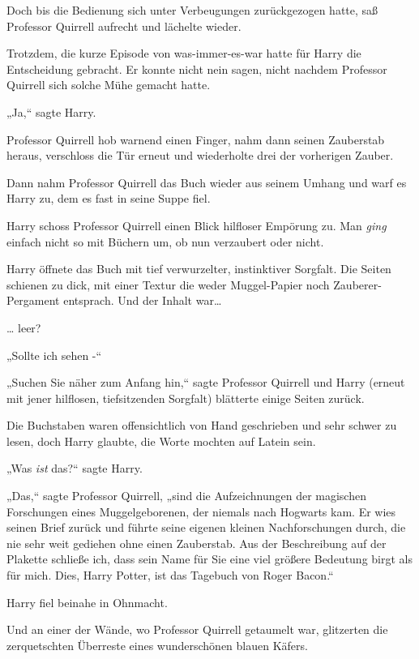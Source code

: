 {Doch bis die Bedienung sich unter Verbeugungen zurückgezogen hatte, saß Professor Quirrell aufrecht und lächelte wieder.

Trotzdem, die kurze Episode von was-immer-es-war hatte für Harry die Entscheidung gebracht. Er konnte nicht nein sagen, nicht nachdem Professor Quirrell sich solche Mühe gemacht hatte.

„Ja,“ sagte Harry.

Professor Quirrell hob warnend einen Finger, nahm dann seinen Zauberstab heraus, verschloss die Tür erneut und wiederholte drei der vorherigen Zauber.

Dann nahm Professor Quirrell das Buch wieder aus seinem Umhang und warf es Harry zu, dem es fast in seine Suppe fiel.

Harry schoss Professor Quirrell einen Blick hilfloser Empörung zu. Man \emph{ging} einfach nicht so mit Büchern um, ob nun verzaubert oder nicht.

Harry öffnete das Buch mit tief verwurzelter, instinktiver Sorgfalt. Die Seiten schienen zu dick, mit einer Textur die weder Muggel-Papier noch Zauberer-Pergament entsprach. Und der Inhalt war…

… leer?

„Sollte ich sehen -“

„Suchen Sie näher zum Anfang hin,“ sagte Professor Quirrell und Harry (erneut mit jener hilflosen, tiefsitzenden Sorgfalt) blätterte einige Seiten zurück.

Die Buchstaben waren offensichtlich von Hand geschrieben und sehr schwer zu lesen, doch Harry glaubte, die Worte mochten auf Latein sein.

„Was \emph{ist} das?“ sagte Harry.

„Das,“ sagte Professor Quirrell, „sind die Aufzeichnungen der magischen Forschungen eines Muggelgeborenen, der niemals nach Hogwarts kam. Er wies seinen Brief zurück und führte seine eigenen kleinen Nachforschungen durch, die nie sehr weit gediehen ohne einen Zauberstab. Aus der Beschreibung auf der Plakette schließe ich, dass sein Name für Sie eine viel größere Bedeutung birgt als für mich. Dies, Harry Potter, ist das Tagebuch von Roger Bacon.“

Harry fiel beinahe in Ohnmacht.

Und an einer der Wände, wo Professor Quirrell getaumelt war, glitzerten die zerquetschten Überreste eines wunderschönen blauen Käfers.

}

